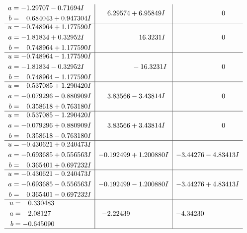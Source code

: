 \documentclass[1p]{elsarticle_modified}
\theoremstyle{definition}
\begin{document}
$$\begin{array}{c|c|c}
\begin{aligned}
a &= -1.29707 - 0.71694 I \\
b &= \phantom{-}0.684043 + 0.947304 I\end{aligned}
 & \phantom{-}6.29574 + 6.95849 I & \phantom{-0.000000 } 0 \\ \hline\begin{aligned}
u &= -0.748964 + 1.177590 I \\
a &= -1.81834 + 0.32952 I \\
b &= \phantom{-}0.748964 + 1.177590 I\end{aligned}
 & \phantom{-0.000000 -}16.3231 I & \phantom{-0.000000 } 0 \\ \hline\begin{aligned}
u &= -0.748964 - 1.177590 I \\
a &= -1.81834 - 0.32952 I \\
b &= \phantom{-}0.748964 - 1.177590 I\end{aligned}
 & \phantom{-0.000000 } -16.3231 I & \phantom{-0.000000 } 0 \\ \hline\begin{aligned}
u &= \phantom{-}0.537085 + 1.290420 I \\
a &= -0.079296 - 0.880909 I \\
b &= \phantom{-}0.358618 + 0.763180 I\end{aligned}
 & \phantom{-}3.83566 - 3.43814 I & \phantom{-0.000000 } 0 \\ \hline\begin{aligned}
u &= \phantom{-}0.537085 - 1.290420 I \\
a &= -0.079296 + 0.880909 I \\
b &= \phantom{-}0.358618 - 0.763180 I\end{aligned}
 & \phantom{-}3.83566 + 3.43814 I & \phantom{-0.000000 } 0 \\ \hline\begin{aligned}
u &= -0.430621 + 0.240473 I \\
a &= -0.693685 + 0.556563 I \\
b &= \phantom{-}0.365401 + 0.697232 I\end{aligned}
 & -0.192499 + 1.200880 I & -3.44276 - 4.83413 I \\ \hline\begin{aligned}
u &= -0.430621 - 0.240473 I \\
a &= -0.693685 - 0.556563 I \\
b &= \phantom{-}0.365401 - 0.697232 I\end{aligned}
 & -0.192499 - 1.200880 I & -3.44276 + 4.83413 I \\ \hline\begin{aligned}
u &= \phantom{-}0.330483\phantom{ +0.000000I} \\
a &= \phantom{-}2.08127\phantom{ +0.000000I} \\
b &= -0.645090\phantom{ +0.000000I}\end{aligned}
 & -2.22439\phantom{ +0.000000I} & -4.34230\phantom{ +0.000000I}\\
 \hline 
 \end{array}$$\newpage\newpage\renewcommand{\arraystretch}{1}
\end{document}
